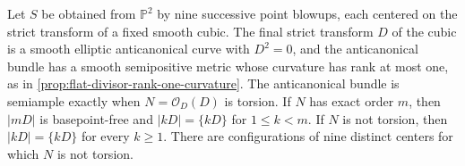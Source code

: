\begin{proposition}\label{prop:nine-point-anticanonical-curvature}
Let $S$ be obtained from $\mathbb P^2$ by nine successive point blowups, each centered on the strict transform of a fixed smooth cubic. The final strict transform $D$ of the cubic is a smooth elliptic anticanonical curve with $D^2=0$, and the anticanonical bundle has a smooth semipositive metric whose curvature has rank at most one, as in \cref{prop:flat-divisor-rank-one-curvature}. The anticanonical bundle is semiample exactly when $N=\mathcal O_D(D)$ is torsion. If $N$ has exact order $m$, then $|mD|$ is basepoint-free and $|kD|=\{kD\}$ for $1\leq k<m$. If $N$ is not torsion, then $|kD|=\{kD\}$ for every $k\geq1$. There are configurations of nine distinct centers for which $N$ is not torsion.
\end{proposition}
